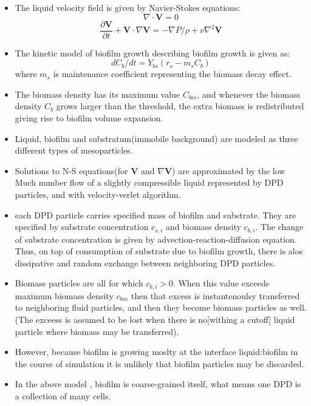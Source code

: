\documentclass[10pt,a4paper]{article}
\begin{document}
\begin{itemize}
 \item The liquid velocity field is given by Navier-Stokes equations:
 \begin{equation}
  \nabla \cdot \mathbf{V} = 0
 \end{equation}
 \begin{equation}
  \frac{\partial \mathbf{V}}{\partial t} + \mathbf{V} \cdot \nabla \mathbf{V} = -\nabla P/\rho + \nu\nabla^2 \mathbf{V}
 \end{equation}
 \item The kinetic model of biofilm growth describing biofilm growth is given as:
 \begin{equation}
  dC_b/dt = Y_{bs}(r_s - m_sC_b)
 \end{equation}
 where $m_s$ is maintenance coefficient representing the biomass decay effect. 
 \item The biomass density has its maximum value $C_{bm}$, and whenever the biomass density $C_b$ grows larger than the threshold, the extra biomass
 is redistributed giving rise to biofilm volume expansion. 
 \item Liquid, biofilm and substratum(immobile background) are modeled as three different types of mesoparticles.
 \item Solutions to N-S equations(for $\mathbf{V}$ and $\nabla \mathbf{V}$) 
 are approximated by the low Much number flow of a slightly compressible liquid represented by DPD particles, and with velocity-verlet algorithm.
 \item each DPD particle carries specified mass of biofilm and substrate. They are specified by substrate concentration $c_{s,i}$ and 
 biomass density $c_{b,i}$. The change of substrate concentration is given by advection-reaction-diffusion equation.
 Thus, on top of consumption of substrate due to biofilm growth, there is alos dissipative and random exchange between neighboring DPD particles.
 \item Biomass particles are all for which $c_{b,i} >0$. When this value exceeds maximum biomass density $c_{bm}$ then that excess is instantenoulsy
 transferred to neighboring fluid particles, and then they become biomass particles as well. 
 (The exceess is assumed to be lost when there is no[withing a cutoff] liquid particle where biomass may be transferred).
 \item However, because biofilm is growing moslty at the interface liquid:biofilm in the course of simulation it is unlikely that
 biofilm particles may be discarded.
 \item In the above model , biofilm is coarse-grained itself, what means one DPD is a collection of many cells.
\end{itemize}
\end{document}
